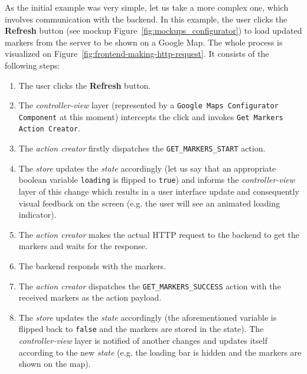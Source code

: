 As the initial example was very simple, let us take a more complex one, which involves communication with the backend. In this example, the user clicks the \textbf{Refresh} button (see mockup Figure~\ref{fig:mockups_configurator}) to load updated markers from the server to be shown on a Google Map. The whole process is visualized on Figure~\ref{fig:frontend-making-http-request}. It consists of the following steps:

\begin{enumerate}
\item The user clicks the \textbf{Refresh} button.
\item The \emph{controller-view} layer (represented by a \texttt{Google Maps Configurator Component} at this moment) intercepts the click and invokes \texttt{Get Markers Action Creator}.
\item The \emph{action creator} firstly dispatches the \texttt{GET\_MARKERS\_START}  action.
\item The \emph{store} updates the \emph{state} accordingly (let us say that an appropriate boolean variable \texttt{loading} is flipped to \texttt{true}) and informs the \emph{controller-view} layer of this change which results in a user interface update and consequently visual feedback on the screen (e.g. the user will see an animated loading indicator).
\item The \emph{action creator} makes the actual HTTP request to the backend to get the markers and waits for the response.
\item The backend responds with the markers.
\item The \emph{action creator} dispatches the \texttt{GET\_MARKERS\_SUCCESS} action with the received markers as the action payload.
\item The \emph{store} updates the \emph{state} accordingly (the aforementioned variable is flipped back to \texttt{false} and the markers are stored in the state). The \emph{controller-view} layer is notified of another changes and updates itself according to the new \emph{state} (e.g. the loading bar is hidden and the markers are shown on the map).
\end{enumerate}
